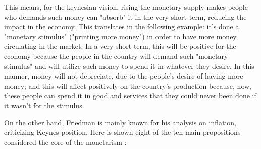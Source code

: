 \documentclass[12pt,a4paper,twoside]{book}
\begin{document}
\begin{itemize}
This means, for the keynesian vision, rising the monetary supply makes people who demands such money can "absorb" it in the very short-term, reducing the impact in the economy. This translates in the following example: it's done a "monetary stimulus" ("printing more money") in order to have more money circulating in the market. In a very short-term, this will be positive for the economy because the people in the country will demand such "monetary stimulus" and will utilize such money to spend it in whatever they desire. In this manner, money will not depreciate, due to the people's desire of having more money; and this will affect positively on the country's production because, now, these people can spend it in good and services that they could never been done if it wasn't for the stimulus.

On the other hand, Friedman is mainly known for his analysis on inflation, criticizing Keynes position. Here is shown eight of the ten main propositions considered the core of the monetarism \cite[pp. 36-37]{friedman:strike}:


\end{itemize}
\end{document}
